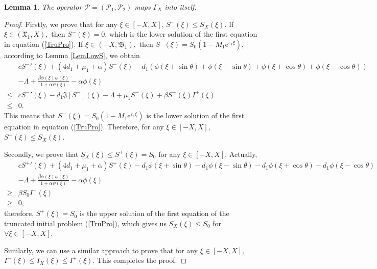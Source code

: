 \documentclass[final,3p,times]{elsarticle}
\newtheorem{lemma}{Lemma}[section]
\numberwithin{equation}{section}
\begin{document}
\begin{lemma}
The operator $\mathcal{P}=(\mathcal{P}_1,\mathcal{P}_2)$ maps $\Gamma_X$ into itself.
\end{lemma}
\begin{proof}
Firstly, we prove that for any $\xi\in[-X,X]$, $S^-(\xi)\leq S_X(\xi)$. If $\xi\in(\mathfrak{X}_1, X),$  then $S^-(\xi)=0$, which is the lower solution of the first equation in equation (\ref{TruPro}). If $\xi\in(-X,\mathfrak{B}_1),$ then $S^-(\xi)=S_0(1-M_1 \mathrm{e}^{\varepsilon_1 \xi})$, according to Lemma \ref{LemLowS}, we obtain
\begin{align*}
&c{S^-}'(\xi) + (4d_1+\mu_1+\alpha)S^-(\xi) - d_{1}(\phi(\xi + \sin\theta) + \phi(\xi - \sin\theta) + \phi(\xi + \cos\theta)
+\phi(\xi - \cos\theta))\\
&- \Lambda + \frac{\beta \phi(\xi)\psi(\xi)}{1+\alpha \psi(\xi)} - \alpha\phi(\xi)\\
\leq & c{S^-}'(\xi) - d_1\mathfrak{J}[S^-](\xi) - \Lambda + \mu_1 S^-(\xi) + \beta S^-(\xi) I^+(\xi)\\
\leq & 0.
\end{align*}
This means that $S^-(\xi)=S_0(1-M_1 \mathrm{e}^{\varepsilon_1 \xi})$ is the lower solution of the first equation in equation (\ref{TruPro}). Therefore, for any $\xi\in[-X,X],$ $S^-(\xi)\leq S_X(\xi)$.

Secondly, we prove that $S_X(\xi)\leq S^+(\xi) = S_0$ for any $\xi\in[-X,X].$ Actually, %
\begin{align*}
&c{S^+}'(\xi) + (4d_1+\mu_1+\alpha)S^+(\xi) - d_{1}\phi(\xi + \sin\theta) - d_{1}\phi(\xi - \sin\theta) - d_{1}\phi(\xi + \cos\theta) - d_{1}\phi(\xi - \cos\theta)\\
& - \Lambda + \frac{\beta \phi(\xi)\psi(\xi)}{1+\alpha \psi(\xi)} - \alpha\phi(\xi)\\
\geq & \beta S_0I^-(\xi)\\
\geq & 0,
\end{align*}
therefore, $S^+(\xi)=S_0$  is the upper solution of the first equation of the truncated initial problem (\ref{TruPro}), which gives us $S_X(\xi)\leq S_0$ for  $\forall \xi\in[-X,X].$

Similarly, we can use a similar approach to prove that for any $\xi\in[-X,X],$~$I^-(\xi)\leq I_X(\xi)\leq I^+(\xi)$. This completes the proof.
\end{proof}
\end{document}
